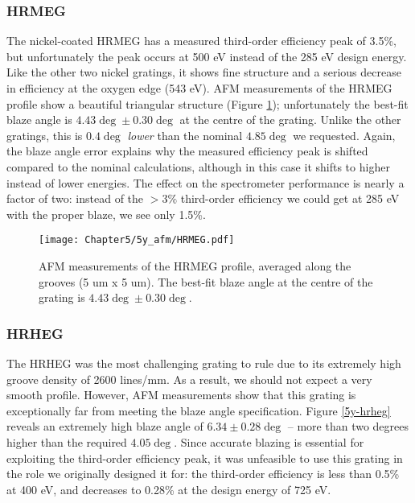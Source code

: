 \subsubsection{HRMEG}
The nickel-coated HRMEG has a measured third-order efficiency peak of 3.5\%, but unfortunately the peak occurs at 500 eV instead of the 285 eV design energy.  Like the other two nickel gratings, it shows fine structure and a serious decrease in efficiency at the oxygen edge (543 eV).  AFM measurements of the HRMEG profile show a beautiful triangular structure (Figure \ref{5y-hrmeg}); unfortunately the best-fit blaze angle is $4.43\deg \pm 0.30\deg$ at the centre of the grating.  Unlike the other gratings, this is $0.4\deg$ \emph{lower} than the nominal $4.85\deg$ we requested.  Again, the blaze angle error explains why the measured efficiency peak is shifted compared to the nominal calculations, although in this case it shifts to higher instead of lower energies.  The effect on the spectrometer performance is nearly a factor of two: instead of the $>3\%$ third-order efficiency we could get at 285 eV with the proper blaze, we see only 1.5\%.

\begin{figure}[htbp] %
   \centering
   \texttt{[image: Chapter5/5y\_afm/HRMEG.pdf]} 
   \caption{AFM measurements of the HRMEG profile, averaged along the grooves (5 um x 5 um).  The best-fit blaze angle at the centre of the grating is $4.43\deg \pm 0.30\deg$.}
   \label{5y-hrmeg}
\end{figure}

\subsubsection{HRHEG}
The HRHEG was the most challenging grating to rule due to its extremely high groove density of 2600 lines/mm.  As a result, we should not expect a very smooth profile.  However, AFM measurements show that this grating is exceptionally far from meeting the blaze angle specification.  Figure \ref{5y-hrheg} reveals an extremely high blaze angle of $6.34 \pm 0.28\deg$ -- more than two degrees higher than the required $4.05\deg$.  Since accurate blazing is essential for exploiting the third-order efficiency peak, it was unfeasible to use this grating in the role we originally designed it for: the third-order efficiency is less than 0.5\% at 400 eV, and decreases to 0.28\% at the design energy of 725 eV.

